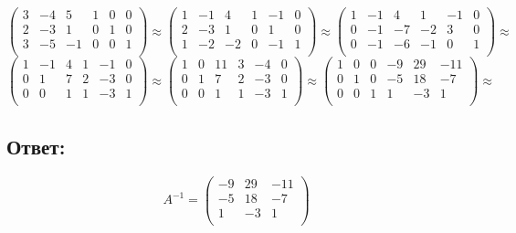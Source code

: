 \documentclass[a4paper]{article}
\begin{document}
\begin{equation*}
 \left(\begin{array}{rrr|rrr}
  3 & -4 & 5 & 1 & 0 & 0\\
2 & -3 & 1& 0 & 1 & 0\\
3 & -5 & -1 & 0 & 0 & 1\\
   \end{array}\right)
   \approx
 \left(\begin{array}{rrr|rrr}
  1 & -1 & 4 & 1 & -1 & 0\\
2 & -3 & 1& 0 & 1 & 0\\
1 & -2 & -2 & 0 & -1 & 1\\
   \end{array}\right)
\approx
 \left(\begin{array}{rrr|rrr}
  1 & -1 & 4 & 1 & -1 & 0\\
0 & -1 & -7& -2 & 3 & 0\\
0 & -1 & -6 & -1 & 0 & 1\\
   \end{array}\right)
  \approx
\end{equation*}
\begin{equation*}
 \left(\begin{array}{rrr|rrr}
  1 & -1 & 4 & 1 & -1 & 0\\
0 & 1 & 7 & 2 & -3 & 0\\
0 & 0 & 1 & 1 & -3 & 1\\
   \end{array}\right)
   \approx
 \left(\begin{array}{rrr|rrr}
1 & 0 & 11 & 3 & -4 & 0\\
0 & 1 & 7 & 2 & -3 & 0\\
0 & 0 & 1 & 1 & -3 & 1\\
   \end{array}\right)
\approx
 \left(\begin{array}{rrr|rrr}
1 & 0 & 0 & -9 & 29 & -11\\
0 & 1 & 0 & -5 & 18 & -7\\
0 & 0 & 1 & 1 & -3 & 1\\
   \end{array}\right)
  \approx
\end{equation*}


\subsection{Ответ:}
\begin{equation*}
A^{-1} = \begin{pmatrix}
-9 & 29 & -11\\
-5 & 18 & -7\\
1 & -3 & 1\\
\end{pmatrix}
\end{equation*}
\end{document}

